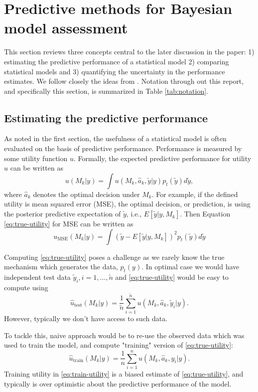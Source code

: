 \documentclass{article}
\begin{document}
\section{Predictive methods for Bayesian model assessment}
This section reviews three concepts central to the later discussion in the paper: 1) estimating the predictive performance of a statistical model 2) comparing statistical models and 3) quantifying the uncertainty in the performance estimates. We follow closely the ideas from \cite{vehtari_survey_2012}. Notation through out this report, and specifically this section, is summarized in Table  \ref{tab:notation}.

\subsection{Estimating the predictive performance}
As noted in the first section, the usefulness of a statistical model is often evaluated on the basis of predictive performance. Performance is measured by some utility function $u$. Formally, the expected predictive performance for utility $u$ can be written as 
\begin{equation}
u(M_k | y) = \int u(M_k, \hat{a}_k, \tilde{y} | y) p_t(\tilde{y}) d\tilde{y}, \label{eq:true-utility}
\end{equation}
where $\hat{a}_k$ denotes the optimal decision under $M_k$. For example, if the defined utility is mean squared error (MSE), the optimal decision, or prediction, is using the posterior predictive expectation of $\tilde{y}$, i.e., $E\left[ \tilde{y} | y, M_k \right]$. Then Equation \eqref{eq:true-utility} for MSE can be written as
$$
u_{\text{MSE}}(M_k | y) = \int \left( \tilde{y} - E\left[ \tilde{y} | y, M_k \right] \right)^2 p_t(\tilde{y}) d\tilde{y}
$$

Computing \eqref{eq:true-utility} poses a challenge as we rarely know the true mechanism which generates the data, $p_t(y)$. In optimal case we would have independent test data $\tilde{y}_i, i=1,...,\tilde{n}$ and \eqref{eq:true-utility} would be easy to compute using
\begin{equation}
    \hat{u}_{\text{test}}(M_k | y) = \frac{1}{\tilde{n}} \sum_{i=1}^{\tilde{n}} u(M_k, \hat{a}_k, \tilde{y}_i | y). \label{eq:test-utility}
\end{equation}
However, typically we don't have access to such data.

To tackle this, naive approach would be to re-use the observed data which was used to train the model, and compute "training" version of \eqref{eq:true-utility}:
\begin{equation}
    \hat{u}_{\text{train}}(M_k | y) = \frac{1}{n} \sum_{i=1}^n u(M_k, \hat{a}_k, y_i | y). \label{eq:train-utility}
\end{equation}
Training utility in \eqref{eq:train-utility} is a biased estimate of \eqref{eq:true-utility}, and typically is over optimistic about the predictive performance of the model.
\end{document}
